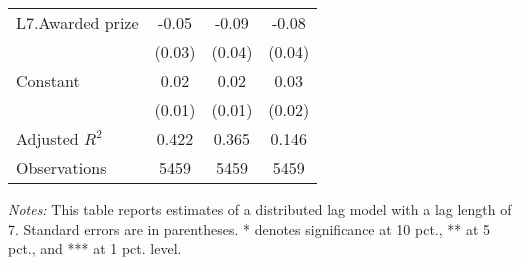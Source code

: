 \begin{table}[h]
{\begin{threeparttable}
\begin{tabular}{l*{3}{c}}
L7.Awarded prize&    -0.05         &    -0.09\sym{**} &    -0.08\sym{**} \\
                &   (0.03)         &   (0.04)         &   (0.04)         \\
Constant        &     0.02\sym{***}&     0.02\sym{***}&     0.03\sym{**} \\
                &   (0.01)         &   (0.01)         &   (0.02)         \\
\midrule
Adjusted \(R^{2}\)&    0.422         &    0.365         &    0.146         \\
Observations    &     5459         &     5459         &     5459         \\
\bottomrule \end{tabular} \begin{tablenotes}[flushleft] \footnotesize \item \emph{Notes:} This table reports estimates of a distributed lag model with a lag length of 7. Standard errors are in parentheses. * denotes significance at 10 pct., ** at 5 pct., and *** at 1 pct. level. \end{tablenotes} \end{threeparttable} } \end{table}

